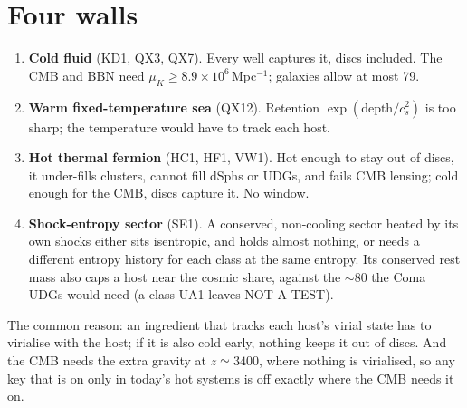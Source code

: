 \documentclass[10pt]{article}
\begin{document}
\section{Four walls}
\begin{enumerate}
\item \textbf{Cold fluid} (KD1, QX3, QX7). Every well captures it, discs included. The CMB and BBN need $\mu_K\ge8.9\times10^6$\,Mpc$^{-1}$; galaxies allow at most 79.
\item \textbf{Warm fixed-temperature sea} (QX12). Retention $\exp(\text{depth}/c_s^2)$ is too sharp; the temperature would have to track each host.
\item \textbf{Hot thermal fermion} (HC1, HF1, VW1). Hot enough to stay out of discs, it under-fills clusters, cannot fill dSphs or UDGs, and fails CMB lensing; cold enough for the CMB, discs capture it. No window.
\item \textbf{Shock-entropy sector} (SE1). A conserved, non-cooling sector heated by its own shocks either sits isentropic, and holds almost nothing, or needs a different entropy history for each class at the same entropy. Its conserved rest mass also caps a host near the cosmic share, against the $\sim80$ the Coma UDGs would need (a class UA1 leaves NOT A TEST).
\end{enumerate}
The common reason: an ingredient that tracks each host's virial state has to virialise with the host; if it is also cold early, nothing keeps it out of discs. And the CMB needs the extra gravity at $z\simeq3400$, where nothing is virialised, so any key that is on only in today's hot systems is off exactly where the CMB needs it on.
\end{document}
